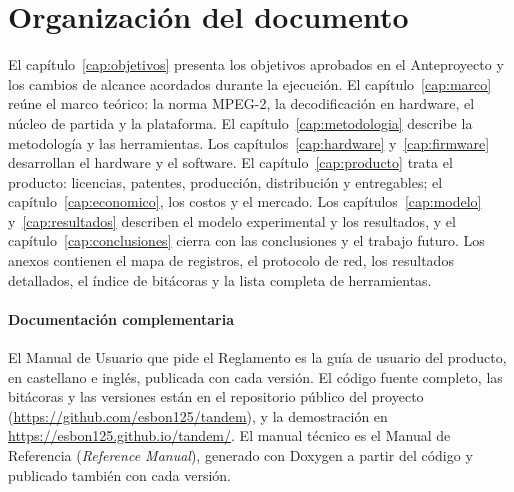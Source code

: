 \section{Organización del documento}

El capítulo~\ref{cap:objetivos} presenta los objetivos aprobados en el
Anteproyecto y los cambios de alcance acordados durante la ejecución. El
capítulo~\ref{cap:marco} reúne el marco teórico: la norma MPEG-2, la
decodificación en hardware, el núcleo de partida y la plataforma. El
capítulo~\ref{cap:metodologia} describe la metodología y las herramientas.
Los capítulos~\ref{cap:hardware} y~\ref{cap:firmware} desarrollan el hardware
y el software. El capítulo~\ref{cap:producto} trata el producto: licencias,
patentes, producción, distribución y entregables; el
capítulo~\ref{cap:economico}, los costos y el mercado. Los
capítulos~\ref{cap:modelo} y~\ref{cap:resultados} describen el modelo
experimental y los resultados, y el capítulo~\ref{cap:conclusiones} cierra con
las conclusiones y el trabajo futuro. Los anexos contienen el mapa de
registros, el protocolo de red, los resultados detallados, el índice de
bitácoras y la lista completa de herramientas.

\paragraph{Documentación complementaria}
El Manual de Usuario que pide el Reglamento es la guía de usuario del
producto, en castellano e inglés, publicada con cada versión. El código
fuente completo, las bitácoras y las versiones están en el repositorio
público del proyecto (\url{https://github.com/esbon125/tandem}), y la
demostración en \url{https://esbon125.github.io/tandem/}. El manual técnico
es el Manual de Referencia (\emph{Reference Manual}), generado con Doxygen a
partir del código y publicado también con cada versión.

